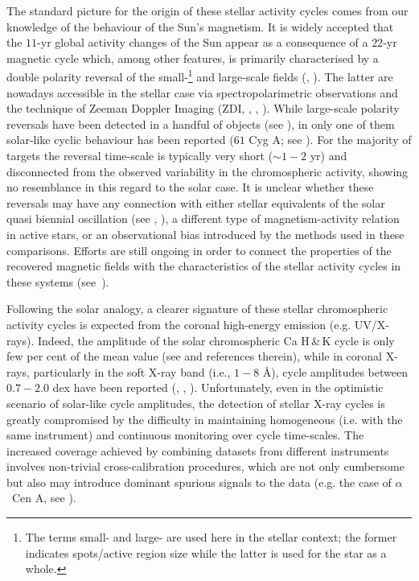 \documentclass[a4paper,fleqn,usenatbib]{mnras}
\begin{document}
The standard picture for the origin of these stellar activity cycles comes from our knowledge of the behaviour of the Sun's magnetism. It is widely accepted that the $11$-yr global activity changes of the Sun appear as a consequence of a $22$-yr magnetic cycle which, among other features, is primarily characterised by a double polarity reversal of the small-\footnote[1]{The terms small- and large- are used here in the stellar context; the former indicates spots/active region size while the latter is used for the star as a whole.} and large-scale fields (, ). The latter are nowadays accessible in the stellar case via spectropolarimetric observations and the technique of Zeeman Doppler Imaging (ZDI, , , ). While large-scale polarity reversals have been detected in a handful of objects (see ), in only one of them solar-like cyclic behaviour has been reported ($61$ Cyg A; see ). For the majority of targets the reversal time-scale is typically very short ($\sim$$1-2$ yr) and disconnected from the observed variability in the chromospheric activity, showing no resemblance in this regard to the solar case. It is unclear whether these reversals may have any connection with either stellar equivalents of the solar quasi biennial oscillation (see , ), a different type of magnetism-activity relation in active stars, or an observational bias introduced by the methods used in these comparisons. Efforts are still ongoing in order to connect the properties of the recovered magnetic fields with the characteristics of the stellar activity cycles in these systems (see~).

Following the solar analogy, a clearer signature of these stellar chromospheric activity cycles is expected from the coronal high-energy emission (e.g. UV/X-rays). Indeed, the amplitude of the solar chromospheric Ca H\,\&\,K cycle is only few per cent of the mean value (see  and references therein), while in coronal X-rays, particularly in the soft X-ray band (i.e., $1 - 8$ \AA), cycle amplitudes between $0.7 - 2.0$ dex have been reported (, , ). Unfortunately, even in the optimistic scenario of solar-like cycle amplitudes, the detection of stellar X-ray cycles is greatly compromised by the difficulty in maintaining homogeneous (i.e. with the same instrument) and continuous monitoring over cycle time-scales. The increased coverage achieved by combining datasets from different instruments involves non-trivial cross-calibration procedures, which are not only cumbersome but also may introduce dominant spurious signals to the data (e.g. the case of $\alpha$~Cen A, see ). 
\end{document}
